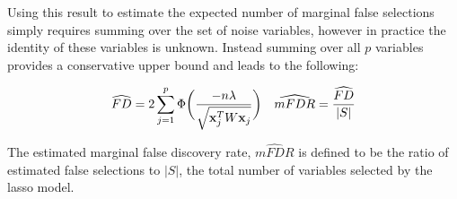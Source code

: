 
Using this result to estimate the expected number of marginal false selections simply requires summing over the set of noise variables, however in practice the identity of these variables is unknown. Instead summing over all $p$ variables provides a conservative upper bound and leads to the following:

\begin{align}
&\widehat{FD} = 2 \sum_{j=1}^{p} \Phi \bigg( \frac{-n\lambda}{\sqrt{\mathbf{x}_j^T W \mathbf{x}_j}} \bigg) & \widehat{mFDR} = \frac{\widehat{FD}}{|S|}
\end{align}

The estimated marginal false discovery rate, $\widehat{mFDR}$ is defined to be the ratio of estimated false selections to $|S|$, the total number of variables selected by the lasso model.

